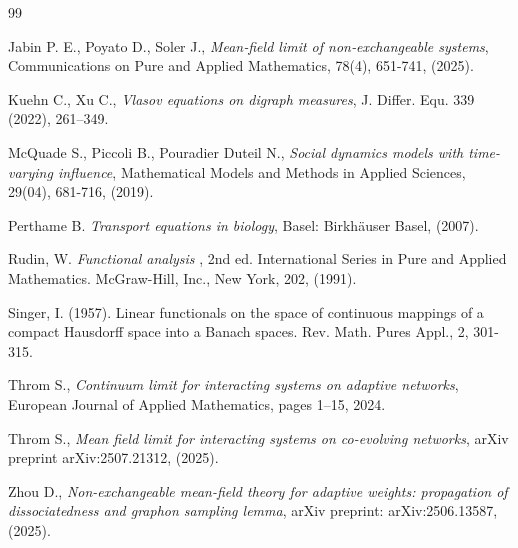 \documentclass[10pt]{article}
\begin{document}
\begin{thebibliography}{99}
{ Jabin P. E., Poyato D.,  Soler J., \textit{ Mean‐field limit of non‐exchangeable systems}, Communications on Pure and Applied Mathematics, 78(4), 651-741, (2025).




  Kuehn C., Xu C., \textit{ Vlasov equations on digraph measures}, J. Differ. Equ. 339 (2022), 261–349.



 McQuade S., Piccoli B., Pouradier Duteil N., \textit{ Social dynamics models with time-varying influence}, Mathematical Models and Methods in Applied Sciences, 29(04), 681-716, (2019).

 Perthame B. \textit{ Transport equations in biology}, Basel: Birkhäuser Basel, (2007).

Rudin, W. \textit{Functional analysis }, 2nd ed. International Series in Pure and Applied Mathematics. McGraw-Hill, Inc., New York, 202, (1991). 

 Singer, I. (1957). Linear functionals on the space of continuous mappings of a compact Hausdorff space into a Banach spaces. Rev. Math. Pures Appl., 2, 301-315.

 Throm S., \textit{ Continuum limit for interacting systems on adaptive networks}, European
Journal of Applied Mathematics, pages 1–15, 2024.

 Throm S., \textit{ Mean field limit for interacting systems on co-evolving networks}, arXiv preprint arXiv:2507.21312, (2025).

 Zhou D., \textit{ Non-exchangeable mean-field theory for adaptive weights: propagation of dissociatedness and graphon sampling lemma},  arXiv preprint: arXiv:2506.13587, (2025).











}
\end{thebibliography}
\end{document}
